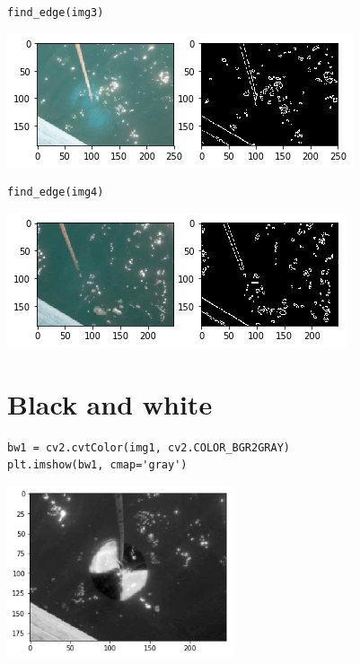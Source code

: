 \begin{verbatim}
find_edge(img3)
\end{verbatim}

\includegraphics{secchi-a/output_21_0.png}

\begin{verbatim}
find_edge(img4)
\end{verbatim}

\includegraphics{secchi-a/output_22_0.png}

\section{Black and white}\label{black-and-white}

\begin{verbatim}
bw1 = cv2.cvtColor(img1, cv2.COLOR_BGR2GRAY)
plt.imshow(bw1, cmap='gray')
\end{verbatim}

\includegraphics[width=0.5\textwidth]{secchi-a/output_26_1.png}
